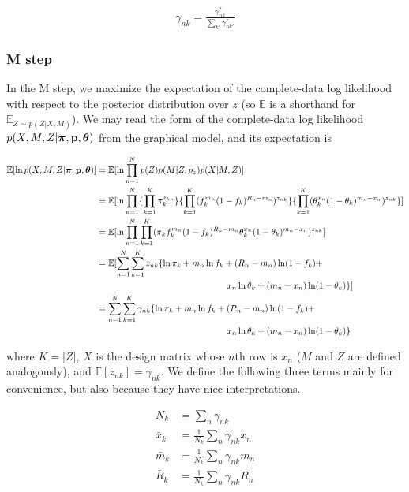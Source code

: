 \documentclass[a4paper]{article}
\newcommand{\vp}{{\bf p}}
\newcommand{\vpi}{{\bm \pi}}
\newcommand{\vtheta}{{\bm \theta}}
\newcommand{\E}{\mathbb{E}}
\begin{document}
\begin{align}
\gamma_{nk} = \frac{\gamma^*_{nk}}{\sum_{k'} \gamma^*_{nk'}}
\end{align}

\subsubsection{M step}
In the M step, we maximize the expectation of the complete-data log likelihood with respect to the posterior distribution over $z$ (so $\E$ is a shorthand for $\E_{Z \sim p(Z|X,M)}$). We may read the form of the complete-data log likelihood $p(X, M, Z | \vpi, \vp, \vtheta)$ from the graphical model, and its expectation is

\begin{align}
\E [ \ln p(X, M , Z | \vpi, \vp, \vtheta) ] &= \E [ \ln \prod_{n = 1}^{N}  p(Z) p(M | Z, p_{z} ) p(X | M, Z ) ] \nonumber \\
							&= \E [ \ln \prod_{n = 1}^{N} \{ \prod_{k = 1}^{K} \pi_k^{z_{kn}} \} \{ \prod_{k = 1}^{K} ( f_k^{m_n} (1-f_k)^{R_n - m_n} ) ^{z_{nk}} \} \{ \prod_{k = 1}^{K} ( \theta_k^{x_n} (1 - \theta_k)^{m_n - x_n} )^{z_{nk}} \} ] \notag \\
							&= \E [ \ln \prod_{n = 1}^{N} \prod_{k = 1}^{K} ( \pi_k  f_{k}^{m_n} (1-f_k)^{R_n - m_n} \theta_k^{x_n} (1 - \theta_k)^{m_n - x_n} )^{z_{nk}} ]  \nonumber \\
							&= \E [ \sum_{n = 1}^{N} \sum_{k = 1}^{K} z_{nk} \{ \ln \pi_k  + m_n \ln f_k + (R_n - m_n) \ln (1-f_k) + \notag \\
							&\phantom{---------------} x_n \ln \theta_k + (m_n - x_n) \ln (1 - \theta_k) \} ]  \nonumber \\
							&= \sum_{n = 1}^{N} \sum_{k = 1}^{K} \gamma_{nk} \{ \ln \pi_k  + m_n \ln f_k + (R_n - m_n) \ln (1-f_k) + \notag \\
						    &\phantom{---------------} x_n \ln \theta_k + (m_n - x_n) \ln (1 - \theta_k) \label{eq:expjointLL} \}
\end{align} 

where $K = |Z|$, $X$ is the design matrix whose $n$th row is $x_n$ ($M$ and $Z$ are defined analogously), and $\E [ z_{nk} ] = \gamma_{nk}$. We define the following three terms mainly for convenience, but also because they have nice interpretations.

\begin{align}
N_k      &= \sum_n \gamma_{nk} \label{eq:nk} \\
\bar{x}_k  &= \frac{1}{N_k} \sum_n \gamma_{nk} x_n \label{eq:xbar} \\
\bar{m}_k &= \frac{1}{N_k} \sum_n \gamma_{nk} m_n \label{eq:mbar} \\
\bar{R}_k  &= \frac{1}{N_k} \sum_n \gamma_{nk} R_n \label{eq:Rbar}
\end{align}
\end{document}
